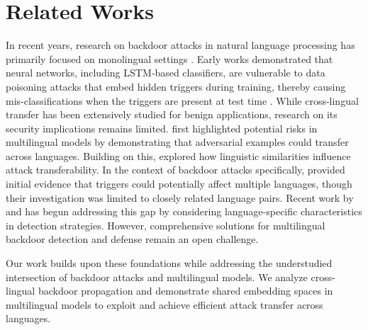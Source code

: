 \section{Related Works}
\label{sec:related}
In recent years, research on backdoor attacks in natural language processing has primarily focused on monolingual settings \citep{backdoor_layerwise, backdoor_review, embedd_bart}. Early works demonstrated that neural networks, including LSTM‐based classifiers, are vulnerable to data poisoning attacks that embed hidden triggers during training, thereby causing mis-classifications when the triggers are present at test time \citep{lstm_backdoor, concealed}.
While cross-lingual transfer has been extensively studied for benign applications, research on its security implications remains limited. \citet{clattack} first highlighted potential risks in multilingual models by demonstrating that adversarial examples could transfer across languages. Building on this, \citet{tuba} explored how linguistic similarities influence attack transferability. In the context of backdoor attacks specifically, \citet{watchout} provided initial evidence that triggers could potentially affect multiple languages, though their investigation was limited to closely related language pairs. Recent work by \citet{zhao2024exploring} and \citet{ppt} has begun addressing this gap by considering language-specific characteristics in detection strategies. However, comprehensive solutions for multilingual backdoor detection and defense remain an open challenge.

Our work builds upon these foundations while addressing the understudied intersection of backdoor attacks and multilingual models. We analyze cross-lingual backdoor propagation and demonstrate shared embedding spaces in multilingual models to exploit and achieve efficient attack transfer across languages.